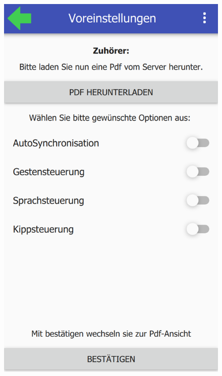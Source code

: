 \begin{figure}[ht!]
	\centering
	\begin{minipage}{0.31\linewidth}
		\centering
		\includegraphics[scale=0.5]{GUI/Bilder/7-H-Voreinstellungen.PNG}
	\end{minipage}
	\begin{minipage}{0.31\linewidth}
		\centering

\end{minipage}
\end{figure}
